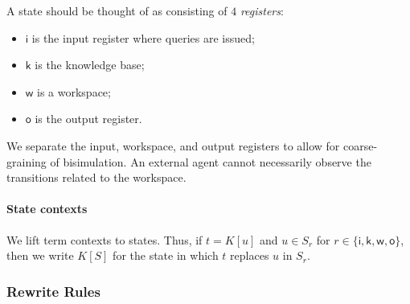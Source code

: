 A state should be thought of as consisting of $4$ \emph{registers}:
\begin{itemize}
  \item $\mathsf{i}$ is the input register where queries are issued;
  \item $\mathsf{k}$ is the knowledge base;
  \item $\mathsf{w}$ is a workspace;
  \item $\mathsf{o}$ is the output register.
\end{itemize}

We separate the input, workspace, and output registers to allow for
coarse-graining of bisimulation. An external agent cannot necessarily observe the transitions related to the workspace.

\paragraph{State contexts}
We lift term contexts to states. Thus, if $t = K[u]$ and $u \in S_{r}$ for $r \in \{ \mathsf{i}, \mathsf{k}, \mathsf{w}, \mathsf{o}\}$, then we write $K[S]$ for the state in which $t$ replaces $u$ in $S_{r}$.

\subsubsection{Rewrite Rules}

